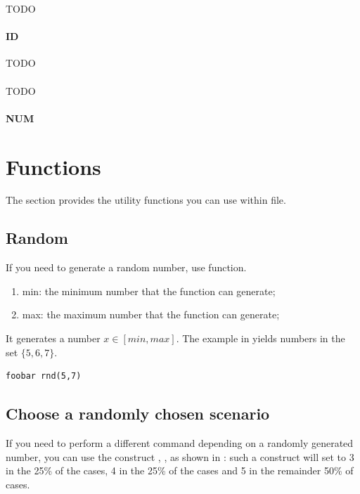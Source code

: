 \begin{appendices}
    TODO

    \paragraph{ ID}

    TODO

    \paragraph{}

    TODO

    \paragraph{ NUM}

    \section{Functions}

    The section provides the utility functions you can use within  file.

    \subsection{Random}

    If you need to generate a random number, use  function.
    \begin{enumerate}
        \item min: the minimum number that the function can generate;
        \item max: the maximum number that the function can generate;
    \end{enumerate}
    It generates a number $x \in [min,max]$. The example in  yields numbers in the set $\{5,6,7\}$.

    \begin{lstlisting}[language=rms,label=rms:rnd]
        foobar rnd(5,7)
    \end{lstlisting}

    \subsection{Choose a randomly chosen scenario}

    If you need to perform a different command depending on a randomly generated number, you can use the construct , , as shown in : such a construct will set  to 3 in the 25\% of the cases, 4 in the 25\% of the cases and 5 in the remainder 50\% of cases.


\end{appendices}
